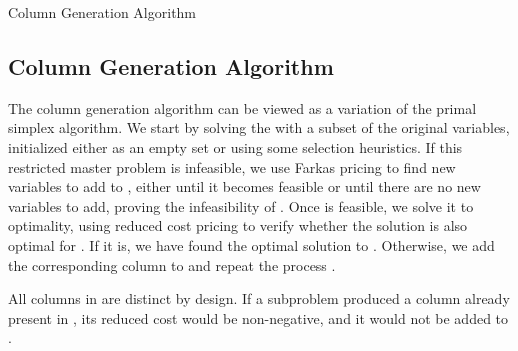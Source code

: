 \begin{algorithm}
\caption{Column Generation Algorithm}

\end{algorithm}

\subsection{Column Generation Algorithm}\label{sec:cg_bp_cg_alg}

The column generation algorithm can be viewed as a variation of the primal simplex algorithm. We start by solving the \MP{} with a subset of the original variables, initialized either as an empty set or using some selection heuristics. If this restricted master problem \RMP{} is infeasible, we use Farkas pricing to find new variables to add to \RMP{}, either until it becomes feasible or until there are no new variables to add, proving the infeasibility of \MP{}. Once \RMP{} is feasible, we solve it to optimality, using reduced cost pricing to verify whether the solution is also optimal for \MP{}. If it is, we have found the optimal solution to \MP{}. Otherwise, we add the corresponding column to \RMP{} and repeat the process \cite{thebook}.

\begin{note}\label{note:distinct_columns}
	All columns in \RMP{} are distinct by design. If a subproblem produced a column already present in \RMP{}, its reduced cost would be non-negative, and it would not be added to \RMP{}.
\end{note}
